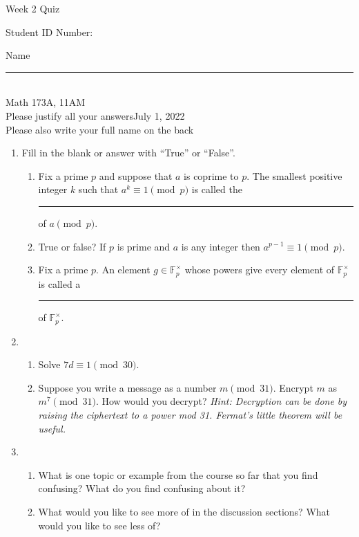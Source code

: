 \documentclass[12pt]{article}
\begin{document}
\begin{flushleft} 
\centerline{\LARGE{Week 2 Quiz}} 
\vspace{5 mm}
{Student ID Number:}\hfill  
{Name \rule {2 in}{0.01in}}\\
Math 173A, 11AM
\\
{Please justify all your answers}\hfill {July 1, 2022}
\\
{Please also write your full name on the back} 

\medskip
\end{flushleft}

\begin{enumerate}
    \item Fill in the blank or answer with ``True'' or ``False''.
        \begin{enumerate}
            \item Fix a prime $p$ and suppose that $a$ is coprime to $p$. The smallest positive integer $k$ such that $a^k \equiv 1\pmod{p}$ is called the \rule{2.5cm}{.15mm} of $a \pmod{p}$.
            \item True or false? If $p$ is prime and $a$ is any integer then $a^{p-1}\equiv 1 \pmod{p}$.
            \item Fix a prime $p$. An element $g \in \mathbb{F}_p^\times$ whose powers give every element of $\mathbb{F}_p^\times$ is called a \rule{2.5cm}{.15mm} of $\mathbb{F}_p^\times$.
        \end{enumerate}
    \vfill
    \item 
    \begin{enumerate}
        \item Solve $7d\equiv 1\pmod{30}$.
        \vfill
        \item Suppose you write a message as a number $m\pmod{31}$. Encrypt $m$ as $m^7\pmod{31}$. How would you decrypt? \textit{Hint: Decryption can be done by raising the ciphertext to a power mod 31. Fermat's little theorem will be useful.}
        \vfill
    \end{enumerate}

    \item \begin{enumerate}
        \item What is one topic or example from the course so far that you find confusing? What do you find confusing about it?

        \vfill

        \item What would you like to see more of in the discussion sections? What would you like to see less of?
        \vfill

    \end{enumerate}
\end{enumerate}

\end{document}
